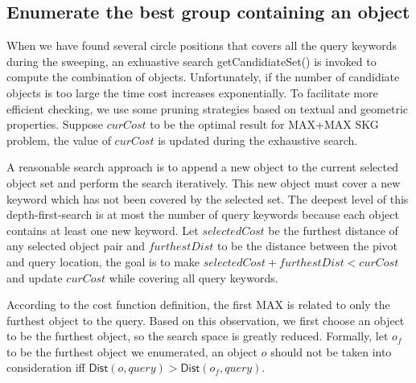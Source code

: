 \documentclass{sig-alternate}
\begin{document}
\subsection{Enumerate the best group containing an object}\label{subsec:type2:search}
When we have found several circle positions that covers all the query keywords during the sweeping,
an exhuastive search \textsf{getCandidiateSet()} is invoked to compute the combination of objects. 
Unfortunately, if the number of candidiate objects 
is too large the time cost increases exponentially. To facilitate more efficient checking,
we use some pruning strategies based on textual and geometric properties. 
Suppose $curCost$ to be the optimal result for \textsf{MAX+MAX SKG} problem,
the value of $curCost$ is updated during the exhaustive search. 

A reasonable search approach is to append a new object to the current selected object set and
perform the search iteratively.
This new object must cover a new keyword which has not been covered by the selected set.
The deepest level of this depth-first-search is at most the number of query keywords because each object
contains at least one new keyword.
Let $selectedCost$ be the furthest distance of any selected object pair and
$furthestDist$ to be the distance between the pivot and query location, the goal is to
make $selectedCost+furthestDist<curCost$ and update $curCost$ while covering all query keywords.
%

According to the cost function definition, the first \textsf{MAX} is related to only
the furthest object to the query. Based on this observation, we first choose an object to be
the furthest object, so the search space is greatly reduced. Formally, let $o_f$ to be the furthest
object we enumerated, an object $o$ should not be taken into consideration 
iff $\textsf{Dist}(o,query)>\textsf{Dist}(o_f,query)$.
\end{document}

